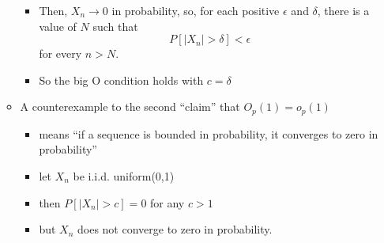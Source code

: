 \begin{itemize}
\begin{itemize}
\begin{itemize}
\item Then, $X_n \to 0$ in probability, so, for each positive
           $\epsilon$ and $\delta$, there is a value of $N$ such that
           \[P[|X_n| > \delta] < \epsilon\] for every $n > N$.
\item So the big O condition holds with $c = \delta$
\end{itemize}
\item A counterexample to the second ``claim'' that $O_p(1) = o_p(1)$
\begin{itemize}
\item means ``if a sequence is bounded in probability, it converges to zero in probability''
\item let $X_n$ be i.i.d. uniform(0,1)
\item then $P[|X_n| > c]  = 0$ for any $c > 1$
\item but $X_n$ does not converge to zero in probability.
\end{itemize}
\end{itemize}
\end{itemize}

